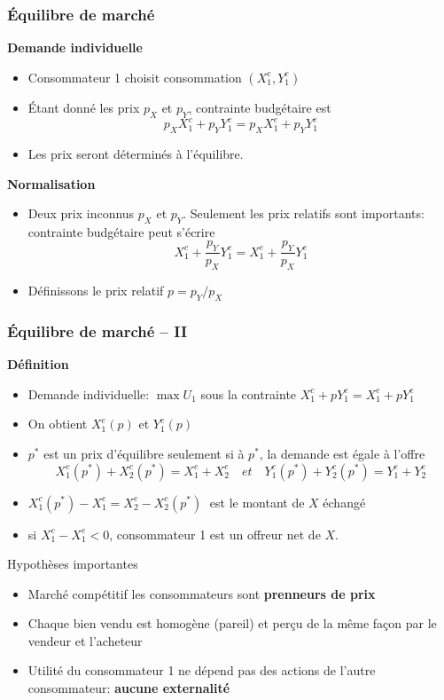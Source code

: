 \documentclass[handout]{beamer}
\newenvironment{iPar}[1]{\textbf{#1} \begin{itemize}}{\end{itemize}}
\newcommand{\mdp}{\medskip \pause}
\begin{document}
\begin{frame}\frametitle{Équilibre de marché}

\begin{iPar}{Demande individuelle} \item Consommateur 1 choisit consommation
$(X_1^c, Y_1^c)$  \item Étant donné les prix $p_X$ et $p_Y$, contrainte budgétaire est $$  p_X X_1^c + p_Y Y_1^c  =  p_X X_1^e + p_Y Y_1^e$$
\item Les prix seront déterminés à l'équilibre.
\end{iPar}\mdp

\begin{iPar}{Normalisation}
\item  Deux prix inconnus $p_X$ et $p_Y$. Seulement les prix relatifs sont importants: contrainte budgétaire peut s'écrire $$
X_1^c + \frac{p_Y}{p_X} Y_1^c  =   X_1^e + \frac{p_Y}{p_X} Y_1^e$$
\item Définissons le prix relatif  $p = p_Y/p_X$  \end{iPar}
\end{frame}

\begin{frame} \frametitle{Équilibre de marché -- II}

\begin{iPar}{Définition} \item Demande individuelle:  $ \max U_1$ sous la contrainte  $ X_1^c + p Y_1^c  =   X_1^e + p Y_1^e$
\item On obtient $X_1^c(p)$ et $Y_1^c(p)$
\item  $p^*$ est un prix d'équilibre seulement si à
$p^*$, la demande est égale à l'offre $$X_1^c(p^*)+X_2^c(p^*) = X_1^e + X_2^e \quad
et \quad Y_1^c(p^*)+Y_2^c(p^*) = Y_1^e + Y_2^e  $$ \item $X_1^c(p^*) -
X_1^e =X_2^e - X_2^c(p^*)  \;$  est le montant de $X$ échangé  \item si $X_1^c - X_1^e < 0$, consommateur 1 est un offreur net de $X$.\end{iPar}\end{frame}


\begin{frame}{Hypothèses importantes}
\begin{itemize} \item Marché compétitif
les consommateurs sont \textbf{prenneurs de prix} \item Chaque bien vendu est homogène (pareil) et perçu de la même façon par le vendeur et l'acheteur \item Utilité du consommateur 1 ne dépend pas des actions de l'autre consommateur: \textbf{aucune externalité} \end{itemize} \end{frame}
\end{document}

